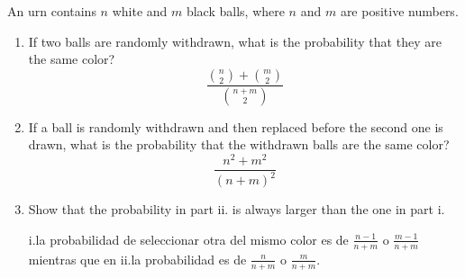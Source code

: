 \item An urn contains $n$ white and $m$ black balls, where $n$ and $m$ are positive numbers.
\begin{enumerate}
    \item If two balls are randomly withdrawn, what is the probability that they are the same color?
    \[ \frac{\binom{n}{2} + \binom{m}{2}}{\binom{n+m}{2}} \]
    
    \item If a ball is randomly withdrawn and then replaced before the second one is drawn, what is the probability that the withdrawn balls are the same color?
    \[ \frac{n^2 + m^2}{(n+m)^2} \]
    
    \item Show that the probability in part ii. is always larger than the one in part i.

    i.\@ la probabilidad de seleccionar otra del mismo color es de $\frac{n-1}{n+m}$ o $\frac{m-1}{n+m}$ mientras que en ii.\@ la probabilidad es de $\frac{n}{n+m}$ o $\frac{m}{n+m}$.
\end{enumerate}